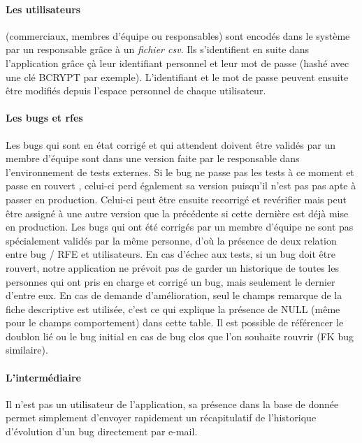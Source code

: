 \documentclass{article}[12pt]
\begin{document}
\paragraph{Les utilisateurs} (commerciaux, membres d'équipe ou responsables) sont encodés dans le système par un responsable grâce à un \textit{fichier csv}. Ils s'identifient en suite dans l'application grâce çà leur identifiant personnel et leur mot de passe (hashé avec une clé BCRYPT par exemple). L'identifiant et le mot de passe peuvent ensuite être modifiés depuis l'espace personnel de chaque utilisateur.

\paragraph{Les bugs et rfes}
Les bugs qui sont en état \og corrigé \fg et qui attendent doivent être validés par un membre d'équipe sont dans une version faite par le responsable dans l'environnement de tests externes. Si le bug ne passe pas les tests à ce moment et passe en \og rouvert \fg{}, celui-ci perd également sa version puisqu'il n'est pas pas apte à passer en production. Celui-ci peut être ensuite recorrigé et revérifier mais peut être assigné à une autre version que la précédente si cette dernière est déjà mise en production.
\newline
\newline
Les bugs qui ont été corrigés par un membre d'équipe ne sont pas spécialement validés par la même personne, d'où la présence de deux relation entre bug / RFE et utilisateurs. En cas d'échec aux tests, si un bug doit être rouvert, notre application ne prévoit pas de garder un historique de toutes les personnes qui ont pris en charge et corrigé un bug, mais seulement le dernier d'entre eux. 
\newline
\newline
En cas de demande d'amélioration, seul le champs \og remarque \fg de la fiche descriptive est utilisée, c'est ce qui explique la présence de NULL (même pour le champs comportement) dans cette table.
\newline
\newline
Il est possible de référencer le doublon lié ou le bug initial en cas de bug clos que l'on souhaite rouvrir (FK bug similaire).


\paragraph{L'intermédiaire}
Il n'est pas un utilisateur de l'application, sa présence dans la base de donnée permet simplement d'envoyer rapidement un récapitulatif de l'historique d'évolution d'un bug directement par e-mail.
\end{document}
